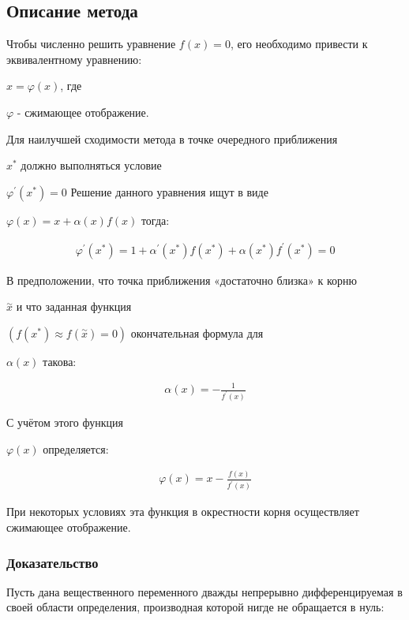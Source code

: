 \documentclass[a4paper]{article}
\begin{document}
\subsection{Описание метода}

Чтобы численно решить уравнение {\(f(x) = 0\)}, его необходимо привести к эквивалентному уравнению:
{{\(x = \varphi(x)\)}, где {{\(\varphi\)} - сжимающее отображение.

Для наилучшей сходимости метода в точке очередного приближения {{\(x^{\ast}\)} должно выполняться условие
{{\(\varphi^{\prime}(x^{\ast}) = 0\)} Решение данного уравнения ищут в виде {{\(\varphi(x) = x + \alpha(x)f(x)\)} тогда:

\begin{equation}
\label{eqn:2.1}
    \begin{aligned}
            \varphi^{\prime}(x^{*})=1+\stackrel{}{\alpha^{\prime}}(x^{*})f(x^{*})+\alpha(x^{*})f^{\prime}(x^{*})=0
    \end{aligned}
\end{equation}

В предположении, что точка приближения «достаточно близка» к корню
{{\(\overset{\sim}{x}\)} и что заданная функция
{{\((f(x^{\ast}) \approx f(\overset{\sim}{x}) = 0)\)}
окончательная формула для
{{\(\alpha(x)\)}
такова:

\begin{equation}
\label{eqn:2.1}
    \begin{aligned}
            \alpha(x)=-{\frac{1}{f^{\prime}(x)}}
    \end{aligned}
\end{equation}

С учётом этого функция {{\(\varphi(x)\)} определяется:

\begin{equation}
\label{eqn:2.1}
    \begin{aligned}
            \varphi(x)=x-{\frac{f(x)}{f^{\prime}(x)}}
    \end{aligned}
\end{equation}

При некоторых условиях эта функция в окрестности корня осуществляет
сжимающее отображение.

\subsubsection{Доказательство}

Пусть дана вещественного переменного дважды непрерывно дифференцируемая в своей области
определения, производная которой нигде не обращается в нуль:

}}}}}}}}}
\end{document}
